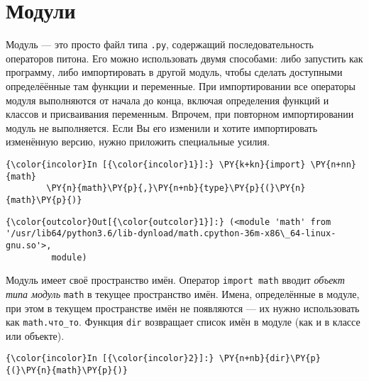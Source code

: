 \section{Модули}
\label{S110}

Модуль --- это просто файл типа \texttt{.py}, содержащий
последовательность операторов питона. Его можно использовать двумя
способами: либо запустить как программу, либо импортировать в другой
модуль, чтобы сделать доступными определёённые там функции и переменные.
При импортировании все операторы модуля выполняются от начала до конца,
включая определения функций и классов и присваивания переменным.
Впрочем, при повторном импортировании модуль не выполняется. Если Вы его
изменили и хотите импортировать изменённую версию, нужно приложить
специальные усилия.

    \begin{Verbatim}[commandchars=\\\{\}]
{\color{incolor}In [{\color{incolor}1}]:} \PY{k+kn}{import} \PY{n+nn}{math}
        \PY{n}{math}\PY{p}{,}\PY{n+nb}{type}\PY{p}{(}\PY{n}{math}\PY{p}{)}
\end{Verbatim}

            \begin{Verbatim}[commandchars=\\\{\}]
{\color{outcolor}Out[{\color{outcolor}1}]:} (<module 'math' from '/usr/lib64/python3.6/lib-dynload/math.cpython-36m-x86\_64-linux-gnu.so'>,
         module)
\end{Verbatim}
        
    Модуль имеет своё пространство имён. Оператор \texttt{import\ math}
вводит \emph{объект типа модуль} \texttt{math} в текущее пространство
имён. Имена, определённые в модуле, при этом в текущем пространстве имён
не появляются --- их нужно использовать как \texttt{math.что\_то}. Функция
\texttt{dir} возвращает список имён в модуле (как и в классе или
объекте).

    \begin{Verbatim}[commandchars=\\\{\}]
{\color{incolor}In [{\color{incolor}2}]:} \PY{n+nb}{dir}\PY{p}{(}\PY{n}{math}\PY{p}{)}
\end{Verbatim}


